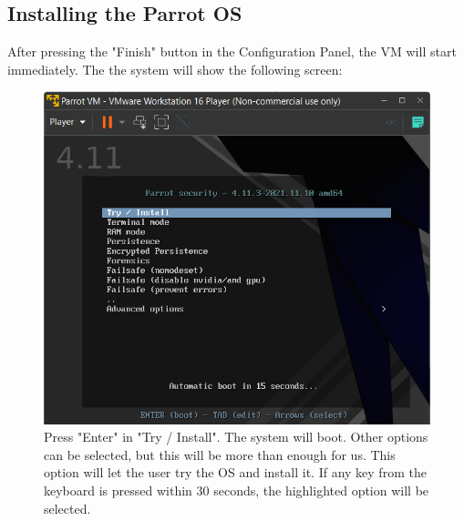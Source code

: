\documentclass[a4paper]{article}
\newcommand\tab[1][1cm]{\hspace*{#1}}
\begin{document}
    \subsection{\textbf{Installing the Parrot OS}}
    \tab After pressing the "Finish" button in the Configuration Panel, the VM will start immediately. The 
    the system will show the following screen:
    \vspace{0.5cm}
    \begin{figure}[h]
        \centering 
        \includegraphics[width=\textwidth, keepaspectratio]{Images/Install_OS/OS_1.png}
        \caption{Press "Enter" in "Try / Install". The system will boot. Other options can be selected, but this 
        will be more than enough for us. This option will let the user try the OS and install it. If any key from the keyboard
        is pressed within 30 seconds, the highlighted option will be selected.}
    \end{figure}
\end{document}

